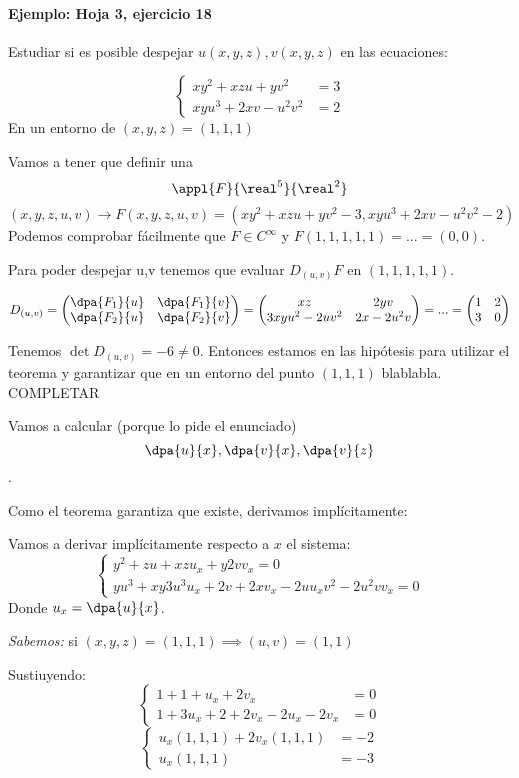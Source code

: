 \paragraph{Ejemplo: Hoja 3, ejercicio 18}

Estudiar si es posible despejar $u(x,y,z), v(x,y,z)$ en las ecuaciones:

\[\left\{\begin{matrix} xy^2+xzu+yv^2 &= 3\\ xyu^3+2xv-u^2v^2 &= 2\end{matrix}\right.\]
En un entorno de $(x,y,z) = (1,1,1)$

Vamos a tener que definir una
\[\appl{F}{\real^5}{\real^2}\]
\[(x,y,z,u,v) \rightarrow F(x,y,z,u,v)= (xy^2+xzu+yv^2-3,xyu^3+2xv-u^2v^2-2)\]
Podemos comprobar fácilmente que $F\in C^{\infty}$ y $F(1,1,1,1,1) = ... = (0,0)$.

Para poder despejar u,v tenemos que evaluar $D_{(u,v)}F$ en $(1,1,1,1,1)$.

\[D_{(u,v)} = \begin{pmatrix} \dpa{F_1}{u}&\dpa{F_1}{v}\\ \dpa{F_2}{u} &\dpa{F_2}{v}\end{pmatrix}
= \begin{pmatrix} xz & 2yv\\3xyu^2-2uv^2 & 2x-2u^2v \end{pmatrix} = ... = \begin{pmatrix} 1&2\\ 3&0 \end{pmatrix}\]

Tenemos $\det D_{(u,v)} = -6 \neq 0$. Entonces estamos en las hipótesis para utilizar el teorema y garantizar que en un entorno del punto $(1,1,1)$ blablabla.
COMPLETAR

Vamos a calcular (porque lo pide el enunciado) \[\dpa{u}{x},\dpa{v}{x},\dpa{v}{z}\].

Como el teorema garantiza que existe, derivamos implícitamente:

Vamos a derivar implícitamente respecto a $x$ el sistema:
\[\left\{\begin{matrix} y^2+zu+xzu_x + y 2v v_x = 0 \\ yu^3+xy3u^3u_x  + 2v + 2xv_x - 2uu_xv^2-2u^2vv_x = 0 \end{matrix}\right.\]
Donde $u_x = \dpa{u}{x}$.

\emph{Sabemos:} si $(x,y,z) = (1,1,1) \implies (u,v) = (1,1)$

Sustiuyendo:
\[\left\{\begin{matrix}1+1+u_x+2v_x &= 0 \\ 1+3u_x+2+2v_x-2u_x-2v_x &= 0\end{matrix}\right.\]
\[\left\{\begin{matrix}u_x(1,1,1) + 2v_x(1,1,1) &= -2\\ u_x(1,1,1) &= -3 \end{matrix}\right.\]

